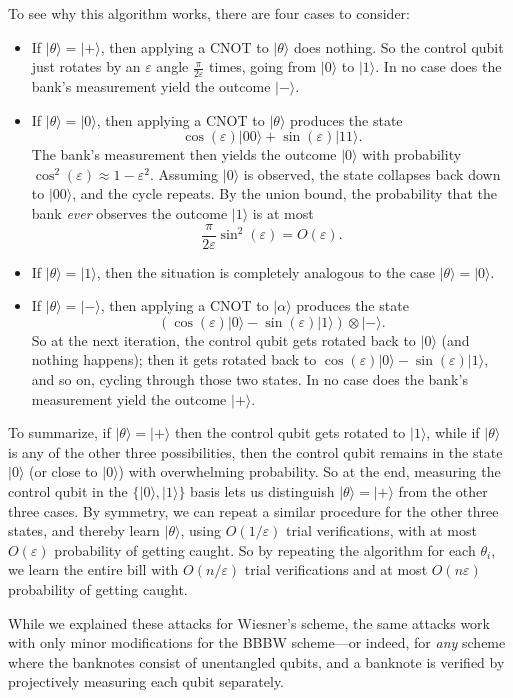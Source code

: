 \documentclass[12pt]{report}
\theoremstyle{plain}
\theoremstyle{definition}
\newcommand{\eps}{\varepsilon}
\renewcommand{\ket}[1]{|#1\rangle}
\begin{document}
To see why this algorithm works, there are four cases to consider:

\begin{itemize}
\item If $\ket{\theta}=\ket{+}$, then applying a CNOT to $\ket{\theta}$ does nothing.  So the control qubit just rotates by an $\eps$ angle $\frac{\pi}{2 \eps}$ times, going from $\ket{0}$ to $\ket{1}$. In no case does the bank's measurement yield the outcome $\ket{-}$.
\item If $\ket{\theta}=\ket{0}$, then applying a CNOT to $\ket{\theta}$ produces the state
$$ \cos(\eps) \ket{00} + \sin(\eps) \ket{11}. $$
The bank's measurement then yields the outcome $\ket{0}$ with probability $\cos^2 (\eps) \approx 1-\eps^2$.  Assuming $\ket{0}$ is observed, the state collapses back down to $\ket{00}$, and the cycle repeats.  By the union bound, the probability that the bank {\em ever} observes the outcome $\ket{1}$ is at most
$$ \frac{\pi}{2 \eps} \sin^2(\eps) = O(\eps). $$
\item If $\ket{\theta}=\ket{1}$, then the situation is completely analogous to the case $\ket{\theta}=\ket{0}$.
\item If $\ket{\theta}=\ket{-}$, then applying a CNOT to $\ket{\alpha}$ produces the state
$$ (\cos(\eps) \ket{0} - \sin(\eps) \ket{1}) \otimes \ket{-}. $$
So at the next iteration, the control qubit gets rotated back to $\ket{0}$ (and nothing happens); then it gets rotated back to $\cos(\eps) \ket{0} - \sin(\eps) \ket{1}$, and so on, cycling through those two states.  In no case does the bank's measurement yield the outcome $\ket{+}$.
\end{itemize}

To summarize, if $\ket{\theta}=\ket{+}$ then the control qubit gets rotated to $\ket{1}$, while if $\ket{\theta}$ is any of the other three possibilities, then the control qubit remains in the state $\ket{0}$ (or close to $\ket{0}$) with overwhelming probability.  So at the end, measuring the control qubit in the $\{ \ket{0},\ket{1} \}$ basis lets us distinguish $\ket{\theta}=\ket{+}$ from the other three cases.  By symmetry, we can repeat a similar procedure for the other three states, and thereby learn $\ket{\theta}$, using $O(1/ \eps)$ trial verifications, with at most $O(\eps )$ probability of getting caught.  So by repeating the algorithm for each $\theta_i$, we learn the entire bill with $O(n / \eps)$ trial verifications and at most $O(n \eps)$ probability of getting caught.

While we explained these attacks for Wiesner's scheme, the same attacks work with only minor modifications for the BBBW scheme---or indeed, for {\em any} scheme where the banknotes consist of unentangled qubits, and a banknote is verified by projectively measuring each qubit separately.
\end{document}
